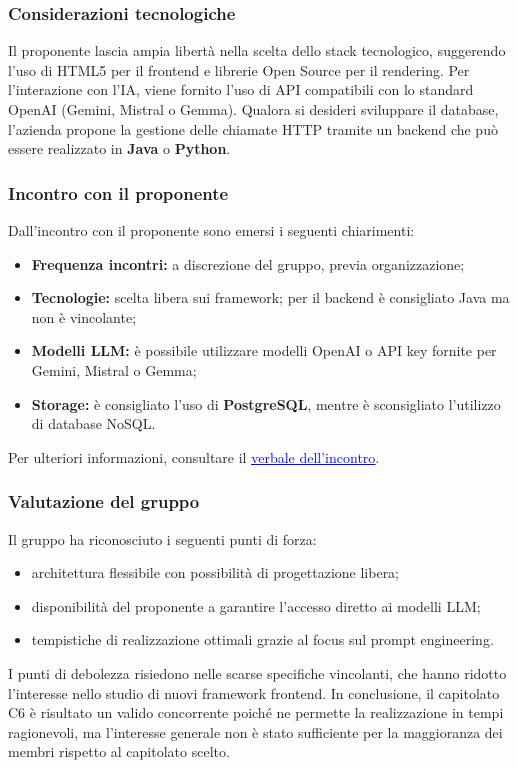\documentclass[a4paper,12pt]{article}
\begin{document}
\subsubsection{Considerazioni tecnologiche}

Il proponente lascia ampia libertà nella scelta dello stack tecnologico, suggerendo l'uso di HTML5 per il frontend e librerie Open Source per il rendering. Per l'interazione con l'IA, viene fornito l'uso di API compatibili con lo standard OpenAI (Gemini, Mistral o Gemma). Qualora si desideri sviluppare il database, l'azienda propone la gestione delle chiamate HTTP tramite un backend che può essere realizzato in \textbf{Java} o \textbf{Python}.

\subsubsection{Incontro con il proponente}

Dall'incontro con il proponente sono emersi i seguenti chiarimenti:
\begin{itemize}
    \item \textbf{Frequenza incontri:} a discrezione del gruppo, previa organizzazione;
    \item \textbf{Tecnologie:} scelta libera sui framework; per il backend è consigliato Java ma non è vincolante;
    \item \textbf{Modelli LLM:} è possibile utilizzare modelli OpenAI o API key fornite per Gemini, Mistral o Gemma;
    \item \textbf{Storage:} è consigliato l'uso di \textbf{PostgreSQL}, mentre è sconsigliato l'utilizzo di database NoSQL.
\end{itemize}

Per ulteriori informazioni, consultare il \href{https://alittlebyte-19.github.io/Documentazione/candidatura/verbali/Verbali%20Esterni/Verbale_Esterno_2026-03-11.pdf}{\textcolor{blue}{\underline{verbale dell'incontro}}}.

\subsubsection{Valutazione del gruppo}

Il gruppo ha riconosciuto i seguenti punti di forza:
\begin{itemize}
    \item architettura flessibile con possibilità di progettazione libera;
    \item disponibilità del proponente a garantire l'accesso diretto ai modelli LLM;
    \item tempistiche di realizzazione ottimali grazie al focus sul prompt engineering.
\end{itemize}

I punti di debolezza risiedono nelle scarse specifiche vincolanti, che hanno ridotto l'interesse nello studio di nuovi framework frontend. In conclusione, il capitolato C6 è risultato un valido concorrente poiché ne permette la realizzazione in tempi ragionevoli, ma l’interesse generale non è stato sufficiente per la maggioranza dei membri rispetto al capitolato scelto.
\end{document}
